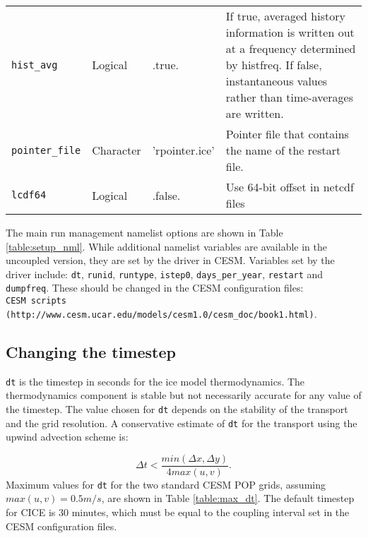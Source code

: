 \begin{table}[hb]
\begin{center}
\begin{tabular}{p{2.0cm}p{2.0cm}p{4.0cm}p{6.5cm}}
{\tt hist\_avg}  &  Logical & .true. & If true, averaged history
                       information is written out at a frequency
                       determined by histfreq.  If false, instantaneous
                       values rather than time-averages are written. \\

{\tt pointer\_file} & Character & 'rpointer.ice' & Pointer file that
                                   contains the name of the restart file. \\

{\tt lcdf64}&  Logical  & .false. & Use 64-bit offset in netcdf files \\

  \hline
  \end{tabular}
  \end{center}
\end{table}

The main run management namelist options are shown in Table 
\ref{table:setup_nml}. While additional namelist variables are available in
the uncoupled version, they are set by the driver in CESM. Variables set by
the driver include: {\tt dt}, {\tt runid}, {\tt runtype}, {\tt istep0}, 
{\tt days\_per\_year}, {\tt restart} and {\tt dumpfreq}. These should be 
changed in the CESM configuration files:\\

  {\tt CESM scripts (http://www.cesm.ucar.edu/models/cesm1.0/cesm\_doc/book1.html)}.\\

\subsection{Changing the timestep}
\label{setup_nml_mgmt}

{\tt dt} is the timestep in seconds for the ice model thermodynamics.
The thermodynamics component is stable but not necessarily accurate for any 
value of the timestep.  The value chosen for {\tt dt} depends on the stability 
of the transport and the grid resolution.  A conservative estimate of {\tt dt} 
for the transport using the upwind advection scheme is:

\begin{equation}
  \Delta t < \frac{min(\Delta x, \Delta y)}{4 max(u, v)} .
\end{equation}
Maximum values for {\tt dt} for the two standard CESM POP grids, assuming 
$max(u,v) = 0.5 m/s$, are shown in Table \ref{table:max_dt}.  The default
timestep for CICE is 30 minutes, which must be equal to the coupling interval
set in the CESM configuration files.

